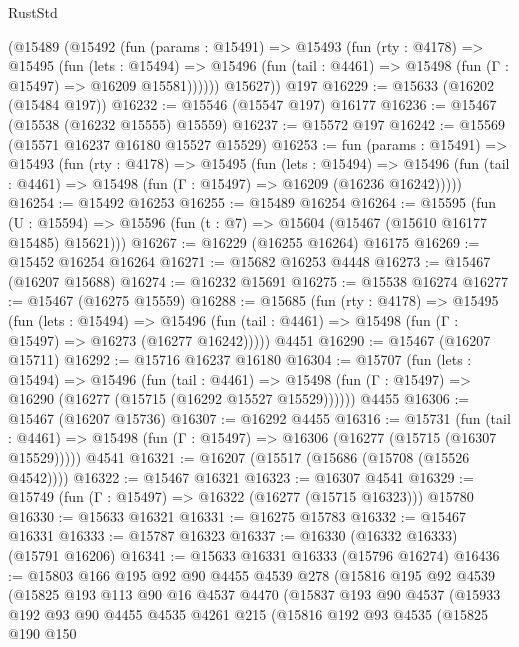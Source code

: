 \begin{lexlean}{RustStd}
\begin{coremodule}
      (@15489
        (@15492
          (fun (params : @15491) =>
          @15493
            (fun (rty : @4178) =>
            @15495
              (fun (lets : @15494) =>
              @15496 (fun (tail : @4461) => @15498 (fun (Γ : @15497) => @16209 @15581))))))
        @15627))
    @197
@16229 := @15633 (@16202 (@15484 @197))
@16232 := @15546 (@15547 @197) @16177
@16236 := @15467 (@15538 (@16232 @15555) @15559)
@16237 := @15572 @197
@16242 := @15569 (@15571 @16237 @16180 @15527 @15529)
@16253 := fun (params : @15491) =>
  @15493
    (fun (rty : @4178) =>
    @15495
      (fun (lets : @15494) =>
      @15496 (fun (tail : @4461) => @15498 (fun (Γ : @15497) => @16209 (@16236 @16242)))))
@16254 := @15492 @16253
@16255 := @15489 @16254
@16264 := @15595
    (fun (U : @15594) => @15596 (fun (t : @7) => @15604 (@15467 (@15610 @16177 @15485) @15621)))
@16267 := @16229 (@16255 @16264) @16175
@16269 := @15452 @16254 @16264
@16271 := @15682 @16253 @4448
@16273 := @15467 (@16207 @15688)
@16274 := @16232 @15691
@16275 := @15538 @16274
@16277 := @15467 (@16275 @15559)
@16288 := @15685
    (fun (rty : @4178) =>
    @15495
      (fun (lets : @15494) =>
      @15496 (fun (tail : @4461) => @15498 (fun (Γ : @15497) => @16273 (@16277 @16242)))))
    @4451
@16290 := @15467 (@16207 @15711)
@16292 := @15716 @16237 @16180
@16304 := @15707
    (fun (lets : @15494) =>
    @15496
      (fun (tail : @4461) =>
      @15498 (fun (Γ : @15497) => @16290 (@16277 (@15715 (@16292 @15527 @15529))))))
    @4455
@16306 := @15467 (@16207 @15736)
@16307 := @16292 @4455
@16316 := @15731
    (fun (tail : @4461) => @15498 (fun (Γ : @15497) => @16306 (@16277 (@15715 (@16307 @15529)))))
    @4541
@16321 := @16207 (@15517 (@15686 (@15708 (@15526 @4542))))
@16322 := @15467 @16321
@16323 := @16307 @4541
@16329 := @15749 (fun (Γ : @15497) => @16322 (@16277 (@15715 @16323))) @15780
@16330 := @15633 @16321
@16331 := @16275 @15783
@16332 := @15467 @16331
@16333 := @15787 @16323
@16337 := @16330 (@16332 @16333) (@15791 @16206)
@16341 := @15633 @16331 @16333 (@15796 @16274)
@16436 := @15803
    @166
    @195
    @92
    @90
    @4455
    @4539
    @278
    (@15816
      @195
      @92
      @4539
      (@15825
        @193
        @113
        @90
        @16
        @4537
        @4470
        (@15837
          @193
          @90
          @4537
          (@15933
            @192
            @93
            @90
            @4455
            @4535
            @4261
            @215
            (@15816
              @192
              @93
              @4535
              (@15825
                @190
                @150

\end{coremodule}
\end{lexlean}
